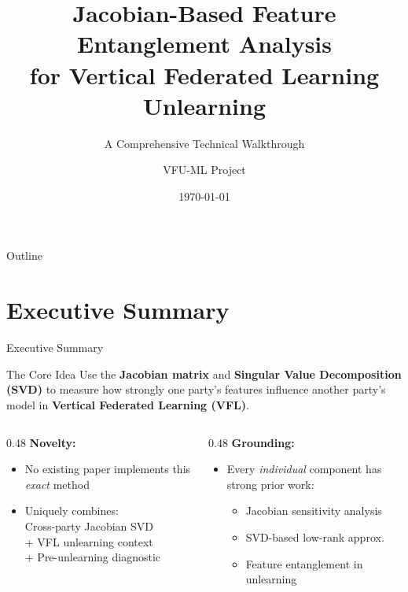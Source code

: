 \documentclass[aspectratio=169, 11pt]{beamer}
\title[Feature Entanglement in VFL]{Jacobian-Based Feature Entanglement Analysis\\for Vertical Federated Learning Unlearning}
\subtitle{A Comprehensive Technical Walkthrough}
\author{VFU-ML Project}
\date{\today}
\institute{CSE 472 --- Machine Learning}
\begin{document}
\begin{frame}
  \titlepage
\end{frame}

\begin{frame}{Outline}
  \tableofcontents
\end{frame}

\section{Executive Summary}

\begin{frame}{Executive Summary}
  \begin{block}{The Core Idea}
    Use the \textbf{Jacobian matrix} and \textbf{Singular Value Decomposition (SVD)} to measure how strongly one party's features influence another party's model in \textbf{Vertical Federated Learning (VFL)}.
  \end{block}
  \vspace{0.3cm}
  \begin{columns}[T]
    \begin{column}{0.48\textwidth}
      \textbf{Novelty:}
      \begin{itemize}
        \item No existing paper implements this \emph{exact} method
        \item Uniquely combines:\\
              \textcolor{deepblue}{Cross-party Jacobian SVD}\\
              \textcolor{deepblue}{+ VFL unlearning context}\\
              \textcolor{deepblue}{+ Pre-unlearning diagnostic}
      \end{itemize}
    \end{column}
    \begin{column}{0.48\textwidth}
      \textbf{Grounding:}
      \begin{itemize}
        \item Every \emph{individual} component has strong prior work:
        \begin{itemize}
          \item Jacobian sensitivity analysis
          \item SVD-based low-rank approx.
          \item Feature entanglement in unlearning
        \end{itemize}
      \end{itemize}
    \end{column}
  \end{columns}
\end{frame}
\end{document}
